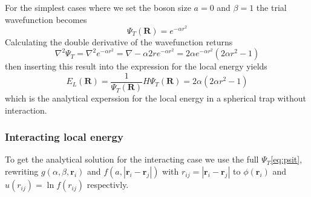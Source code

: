 \documentclass[12pt]{article}
\begin{document}
  For the simplest cases where we set the boson size $a = 0$ and $\beta = 1$ the 
  trial wavefunction becomes 
  \begin{equation}
    \Psi_T(\bm{R}) = e^{-\alpha r^2}
    \label{eq:psi1}
  \end{equation}
  Calculating the double derivative of the wavefunction returns
  \begin{equation}
    \nabla^2\Psi_T = \nabla^2 e^{-\alpha r^2} = \nabla -\alpha 2r e^{-\alpha r^2}%
    = 2\alpha e^{-\alpha r^2}(2\alpha r^2-1)
  \end{equation}
  then inserting this result into the expression for the local energy yields
  \begin{equation}
    E_L(\bm{R}) = \frac{1}{\Psi_T(\bm{R})}H\Psi_T(\bm{R}) = 2\alpha(2\alpha r^2-1)
  \end{equation}
  which is the analytical experssion for the local energy in a spherical trap 
  without interaction.
  \subsubsection{Interacting local energy}
  To get the analytical solution for the interacting case we use the full $\Psi_T$\ref{eq:psit},
  rewriting $g(\alpha,\beta,{\bm r}_i)$ and $f(a,|{\bm r}_i-{\bm r}_j|)$ with 
  $r_{ij} = |{\bm r}_i-{\bm r}_j|$ to $\phi({\bm r}_i)$ and $u(r_{ij}) = \ln f(r_{ij})$ 
  respectivly. 
\end{document}
